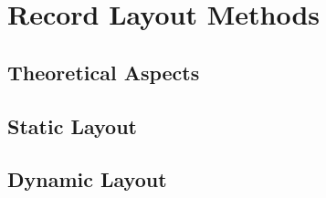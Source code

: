 \section{Record Layout Methods}

\subsection{Theoretical Aspects}

\subsection{Static Layout}

\subsection{Dynamic Layout}
